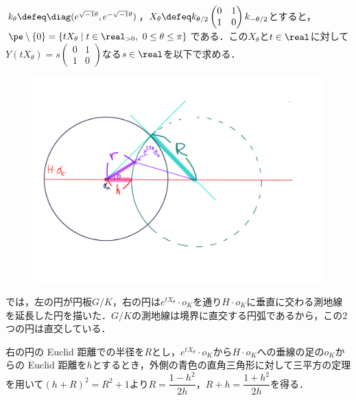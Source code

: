 \begin{npfwn}


  $k_{\theta} \defeq \diag(e^{\sqrt{-1}\theta},e^{-\sqrt{-1}\theta}) $，$X_{\theta} \defeq k_{\theta/2}
  \begin{pmatrix}
    0 & 1 \\ 1 & 0
  \end{pmatrix}
  k_{-\theta/2}$とすると，$\pe\setminus\{0\} =  \{tX_{\theta}\mid t\in \real_{>0},\ 0\leq \theta\leq \pi\}$である．この$X_{\theta} $と$t\in \real$に対して$Y(tX_{\theta} ) = s
  \begin{pmatrix}
    0 & 1 \\ 1 & 0
  \end{pmatrix}
  $なる$s\in \real $を以下で求める．


  
  \begin{figure}[H]
    \centering
    \includegraphics[scale=0.35]{../graph/prob-eg-2.pdf}
    \caption{}
    \label{fig:prob-eg-1}
  \end{figure}

  では，左の円が{\Poincare}円板$G/K$，右の円は$e^{tX_{\theta}}\cdot o_K $を通り$H\cdot o_K$に垂直に交わる測地線を延長した円を描いた．$G/K$の測地線は境界に直交する円弧であるから，この2つの円は直交している．

  右の円の Euclid 距離での半径を$R$とし，$e^{tX_{\theta}}\cdot o_K $から$H\cdot o_K$への垂線の足の$o_K$からの Euclid 距離を$h$とするとき，外側の青色の直角三角形に対して三平方の定理を用いて$(h+R)^2 = R^2 +  1 $より$R = \dfrac{1-h^2}{2h}$，$R+h = \dfrac{1+h^2}{2h}  $を得る．


\end{npfwn}

